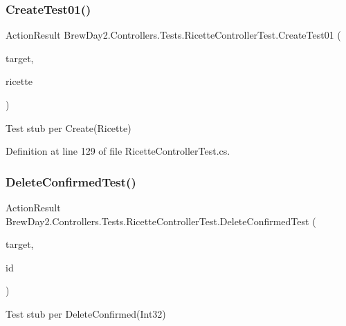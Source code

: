 \subsubsection{\texorpdfstring{Create\+Test01()}{CreateTest01()}}
{\footnotesize\ttfamily Action\+Result Brew\+Day2.\+Controllers.\+Tests.\+Ricette\+Controller\+Test.\+Create\+Test01 (\begin{DoxyParamCaption}\item[{\mbox{[}\+Pex\+Assume\+Under\+Test\mbox{]} \mbox{\hyperlink{class_brew_day2_1_1_controllers_1_1_ricette_controller}{Ricette\+Controller}}}]{target,  }\item[{\mbox{\hyperlink{class_brew_day2_1_1_models_1_1_ricette}{Ricette}}}]{ricette }\end{DoxyParamCaption})}



Test stub per Create(\+Ricette)



Definition at line 129 of file Ricette\+Controller\+Test.\+cs.

\mbox{\label{class_brew_day2_1_1_controllers_1_1_tests_1_1_ricette_controller_test_a9d30c617c3d811d1e71c24fbb5cec687}} 
\subsubsection{\texorpdfstring{Delete\+Confirmed\+Test()}{DeleteConfirmedTest()}}
{\footnotesize\ttfamily Action\+Result Brew\+Day2.\+Controllers.\+Tests.\+Ricette\+Controller\+Test.\+Delete\+Confirmed\+Test (\begin{DoxyParamCaption}\item[{\mbox{[}\+Pex\+Assume\+Under\+Test\mbox{]} \mbox{\hyperlink{class_brew_day2_1_1_controllers_1_1_ricette_controller}{Ricette\+Controller}}}]{target,  }\item[{int}]{id }\end{DoxyParamCaption})}



Test stub per Delete\+Confirmed(\+Int32)



